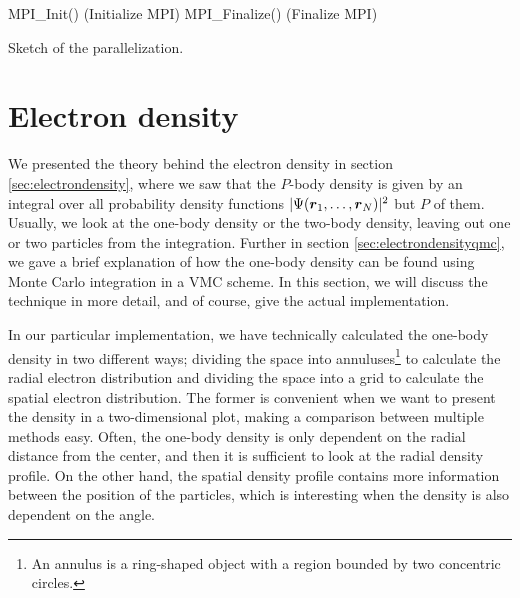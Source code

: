 \IncMargin{1em}
\begin{algorithm}[H]
	\SetAlgoLined
	MPI\_Init() (Initialize MPI)\;
	MPI\_Finalize() (Finalize MPI)\;
	\caption{Sketch of the parallelization.}
	\label{alg:mpi}
\end{algorithm}\DecMargin{1em}

\section{Electron density} \label{sec:electrondensityimplementation}
We presented the theory behind the electron density in section \ref{sec:electrondensity}, where we saw that the $P$-body density is given by an integral over all probability density functions $|\Psi(\boldsymbol{{r}}_1,\hdots,\boldsymbol{{r}}_N)|^2$ but $P$ of them. Usually, we look at the one-body density or the two-body density, leaving out one or two particles from the integration. Further in section \ref{sec:electrondensityqmc}, we gave a brief explanation of how the one-body density can be found using Monte Carlo integration in a VMC scheme. In this section, we will discuss the technique in more detail, and of course, give the actual implementation.

In our particular implementation, we have technically calculated the one-body density in two different ways; dividing the space into annuluses\footnote{An annulus is a ring-shaped object with a region bounded by two concentric circles.} to calculate the radial electron distribution and dividing the space into a grid to calculate the spatial electron distribution. The former is convenient when we want to present the density in a two-dimensional plot, making a comparison between multiple methods easy. Often, the one-body density is only dependent on the radial distance from the center, and then it is sufficient to look at the radial density profile. On the other hand, the spatial density profile contains more information between the position of the particles, which is interesting when the density is also dependent on the angle.

